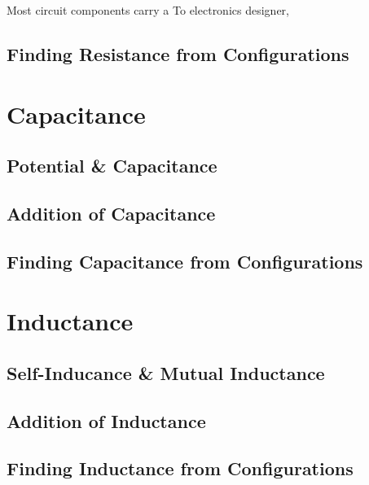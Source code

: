 \documentclass[class=article, crop=false, 12pt]{standalone}
\begin{document}
Most circuit components carry a To electronics designer, 



\subsection{Finding Resistance from Configurations}

\begin{example}
    
\end{example}

\linesep
\section{Capacitance}

\subsection{Potential \& Capacitance}

\subsection{Addition of Capacitance}

\subsection{Finding Capacitance from Configurations}

\linesep
\section{Inductance}

\subsection{Self-Inducance \& Mutual Inductance}

\subsection{Addition of Inductance}

\subsection{Finding Inductance from Configurations}

\theend
\end{document}
